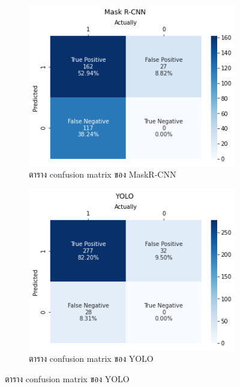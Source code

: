 \documentclass[12pt,oneside,openright,a4paper]{cpe-thai-project}
\begin{document}
\begin{figure}[!h]
\centering
    \begin{subfigure}[b]{0.42\textwidth}
      \centering
        \includegraphics[width=\textwidth]{images/cmMaskR-CNN.png}
        \caption{ตาราง confusion matrix ของ MaskR-CNN}\label{fig:mMaskR-CNN}
    \end{subfigure}
    \begin{subfigure}[b]{0.42\textwidth}
      \centering
        \includegraphics[width=\textwidth]{images/cmYOLO.png}
        \caption{ตาราง confusion matrix ของ YOLO}\label{fig:cmYOLO}

\end{subfigure}
\end{figure}
\end{document}
